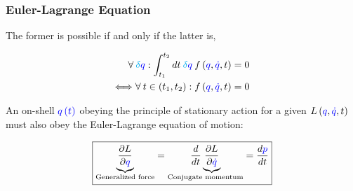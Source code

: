 \documentclass{beamer}
\begin{document}
\begin{frame}
\frametitle{Euler-Lagrange Equation}

\begin{lemma}
The former is possible if and only if the latter is,

\begin{align*}
\forall \: \textcolor{cyan}{\delta} \textcolor{blue}{q} : \int_{t_1}^{t_2} dt \: \textcolor{cyan}{\delta} \textcolor{blue}{q} \: f \left( \textcolor{blue}{q}, \textcolor{blue}{\dot{q}}, t \right) & = 0 \\
\Longleftrightarrow \forall \: t \in \left( t_1, t_2 \right) : f \left( \textcolor{blue}{q}, \textcolor{blue}{\dot{q}}, t \right) & = 0
\end{align*}
\end{lemma}

\begin{theorem}
An on-shell $\textcolor{blue}{q \left( t \right)}$ obeying the principle of stationary action for a given $L \left( \textcolor{blue}{q}, \textcolor{blue}{\dot{q}}, t \right)$ must also obey the Euler-Lagrange equation of motion:

$$\boxed{\underset{\text{Generalized force}}{\underbrace{\frac{\partial L}{\partial \textcolor{blue}{q}}}} = \underset{\text{Conjugate momentum}}{\frac{d}{dt} \underbrace{\frac{\partial L}{\partial \textcolor{blue}{\dot{q}}}}} = \frac{d \textcolor{blue}{p}}{dt}}$$
\end{theorem}
\end{frame}
\end{document}
